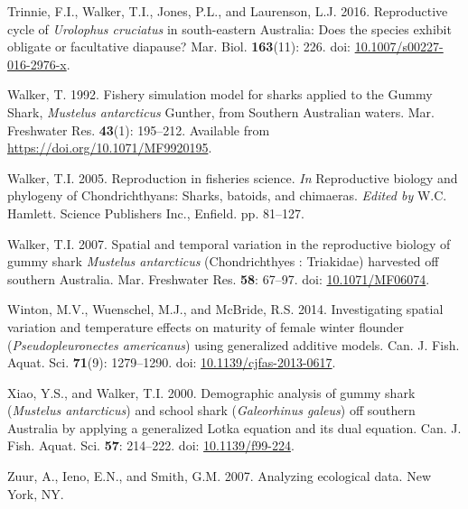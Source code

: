 \documentclass[
]{article}
\newenvironment{CSLReferences}%
  {}%
  {\par}
\begin{document}
\begin{CSLReferences}{1}{0}
Trinnie, F.I., Walker, T.I., Jones, P.L., and Laurenson, L.J. 2016. Reproductive cycle of \emph{{Urolophus} cruciatus} in south-eastern {Australia}: {Does} the species exhibit obligate or facultative diapause? Mar. Biol. \textbf{163}(11): 226. doi: \href{https://doi.org/10.1007/s00227-016-2976-x}{10.1007/s00227-016-2976-x}.

Walker, T. 1992. Fishery simulation model for sharks applied to the {Gummy} {Shark}, \emph{{Mustelus} antarcticus} {Gunther}, from {Southern} {Australian} waters. Mar. Freshwater Res. \textbf{43}(1): 195--212. Available from \url{https://doi.org/10.1071/MF9920195}.

Walker, T.I. 2005. Reproduction in fisheries science. \emph{In} Reproductive biology and phylogeny of {Chondrichthyans}: Sharks, batoids, and chimaeras. \emph{Edited by} W.C. Hamlett. Science Publishers Inc., Enfield. pp. 81--127.

Walker, T.I. 2007. Spatial and temporal variation in the reproductive biology of gummy shark \emph{{Mustelus} antarcticus} ({Chondrichthyes} : {Triakidae}) harvested off southern {Australia}. Mar. Freshwater Res. \textbf{58}: 67--97. doi: \href{https://doi.org/10.1071/MF06074}{10.1071/MF06074}.

Winton, M.V., Wuenschel, M.J., and McBride, R.S. 2014. Investigating spatial variation and temperature effects on maturity of female winter flounder ({\emph{Pseudopleuronectes americanus}}) using generalized additive models. Can. J. Fish. Aquat. Sci. \textbf{71}(9): 1279--1290. doi: \href{https://doi.org/10.1139/cjfas-2013-0617}{10.1139/cjfas-2013-0617}.

Xiao, Y.S., and Walker, T.I. 2000. Demographic analysis of gummy shark (\emph{{Mustelus} antarcticus}) and school shark (\emph{{Galeorhinus} galeus}) off southern {Australia} by applying a generalized {Lotka} equation and its dual equation. Can. J. Fish. Aquat. Sci. \textbf{57}: 214--222. doi: \href{https://doi.org/10.1139/f99-224}{10.1139/f99-224}.

Zuur, A., Ieno, E.N., and Smith, G.M. 2007. Analyzing ecological data. New York, NY.

\end{CSLReferences}
\end{document}
